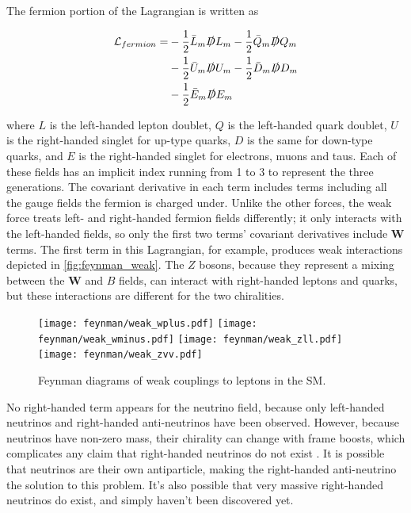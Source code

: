 The fermion portion of the Lagrangian is written as

\begin{equation}
\begin{split}
\mathcal{L}_{fermion} = & -\frac{1}{2}\bar{L}_m\slashed{D}L_m -\frac{1}{2}\bar{Q}_m\slashed{D}Q_m \\
						& -\frac{1}{2}\bar{U}_m\slashed{D}U_m -\frac{1}{2}\bar{D}_m\slashed{D}D_m \\
						& -\frac{1}{2}\bar{E}_m\slashed{D}E_m \\
\end{split}
\end{equation}

where $L$ is the left-handed lepton doublet, $Q$ is the left-handed quark doublet, $U$ is the right-handed singlet for up-type quarks, $D$ is the same for down-type quarks, and $E$ is the right-handed singlet for electrons, muons and taus. Each of these fields has an implicit index running from 1 to 3 to represent the three generations. The covariant derivative in each term includes terms including all the gauge fields the fermion is charged under. Unlike the other forces, the weak force treats left- and right-handed fermion fields differently; it only interacts with the left-handed fields, so only the first two terms' covariant derivatives include $\bm{W}$ terms. The first term in this Lagrangian, for example, produces weak interactions depicted in \autoref{fig:feynman_weak}. The $Z$ bosons, because they represent a mixing between the $\bm{W}$ and $B$ fields, can interact with right-handed leptons and quarks, but these interactions are different for the two chiralities. 

\begin{centering}
\begin{figure}[!hbt]
\myfloatalign
\texttt{[image: feynman/weak\_wplus.pdf]}
\texttt{[image: feynman/weak\_wminus.pdf]}
\texttt{[image: feynman/weak\_zll.pdf]}
\texttt{[image: feynman/weak\_zvv.pdf]}
\caption{Feynman diagrams of weak couplings to leptons in the \ac{SM}.}
\label{fig:feynman_weak}
\end{figure}
\end{centering}

No right-handed term appears for the neutrino field, because only left-handed neutrinos and right-handed anti-neutrinos have been observed. However, because neutrinos have non-zero mass, their chirality can change with frame boosts, which complicates any claim that right-handed neutrinos do not exist \cite{Burgess:2007zi}. It is possible that neutrinos are their own antiparticle, making the right-handed anti-neutrino the solution to this problem. It's also possible that very massive right-handed neutrinos do exist, and simply haven't been discovered yet. 

